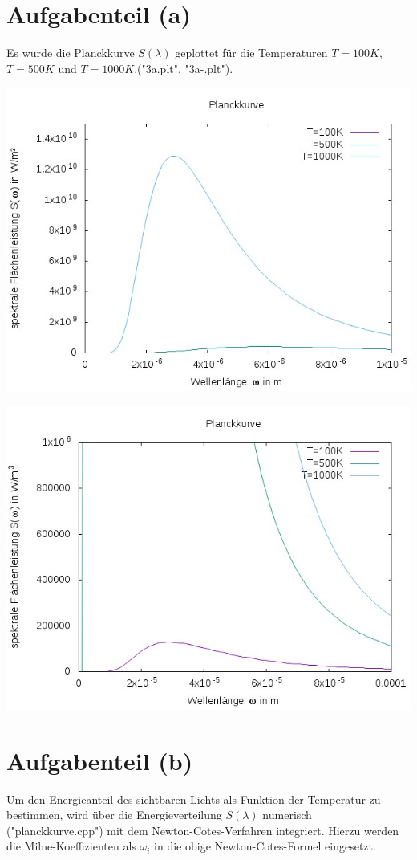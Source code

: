 \documentclass{scrreprt}
\begin{document}
\section*{Aufgabenteil (a)}
Es wurde die Planckkurve $S(\lambda)$ geplottet für die Temperaturen $T=100K$, $T=500K$ und $T=1000K$.("3a.plt", "3a-.plt").
\begin{center}
	\includegraphics[scale=0.6]{3a_1000.jpeg}
\end{center}
\begin{center}	
	\includegraphics[scale=0.6]{3a_100.jpeg}
\end{center}

\section*{Aufgabenteil (b)}
Um den Energieanteil des sichtbaren Lichts als Funktion der Temperatur zu bestimmen, wird über die Energieverteilung $S(\lambda)$ numerisch ("planckkurve.cpp") mit dem Newton-Cotes-Verfahren integriert. Hierzu werden die Milne-Koeffizienten als $\omega_i$ in die obige Newton-Cotes-Formel eingesetzt.
\end{document}
